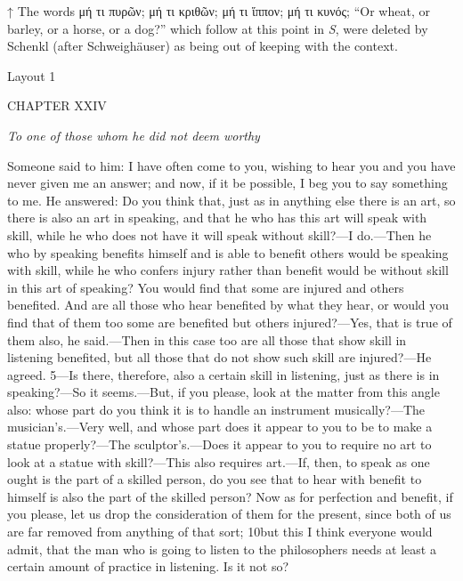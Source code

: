 

↑ The words μή τι πυρῶν; μή τι κριθῶν; μή τι ἵππον; μή τι κυνός; ``Or wheat, or barley, or a horse, or a dog?'' which follow at this point in \emph{S}, were deleted by Schenkl (after Schweighäuser) as being out of keeping with the context.


Layout 1

CHAPTER XXIV

\emph{To one of those whom he did not deem worthy}

Someone said to him: I have often come to you, wishing to hear you and you have never given me an answer; and now, if it be possible, I beg you to say something to me. He answered: Do you think that, just as in anything else there is an art, so there is also an art in speaking, and that he who has this art will speak with skill, while he who does not have it will speak without skill?—I do.—Then he who by speaking benefits himself and is able to benefit others would be speaking with skill, while he who confers injury rather than benefit would be without skill in this art of speaking? You would find that some are injured and others benefited. And are all those who hear benefited by what they hear, or would you find that of them too some are benefited but others injured?—Yes, that is true of them also, he said.—Then in this case too are all those that show skill in listening benefited, but all those that do not show such skill are injured?—He agreed. 5—Is there, therefore, also a certain skill in listening, just as there is in speaking?—So it seems.—But, if you please, look at the matter from this angle also: whose part do you think it is to handle an instrument musically?—The musician's.—Very well, and whose part does it appear to you to be to make a statue properly?—The sculptor's.—Does it appear to you to require no art to look at a statue with skill?—This also requires art.—If, then, to speak as one ought is the part of a skilled person, do you see that to hear with benefit to himself is also the part of the skilled person? Now as for perfection and benefit, if you please, let us drop the consideration of them for the present, since both of us are far removed from anything of that sort; 10but this I think everyone would admit, that the man who is going to listen to the philosophers needs at least a certain amount of practice in listening. Is it not so?

